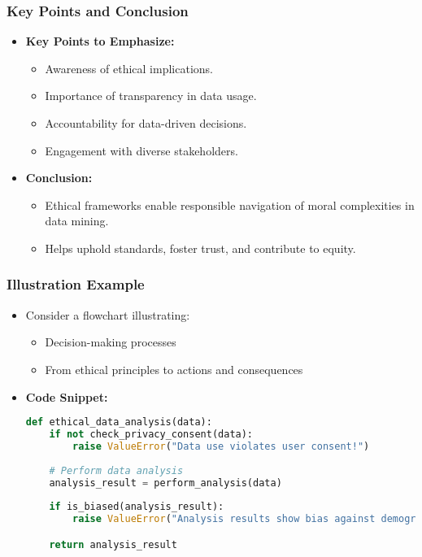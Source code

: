 \documentclass[aspectratio=169]{beamer}
\begin{document}
\begin{frame}[fragile]
    \frametitle{Key Points and Conclusion}
    \begin{itemize}
        \item \textbf{Key Points to Emphasize:}
        \begin{itemize}
            \item Awareness of ethical implications.
            \item Importance of transparency in data usage.
            \item Accountability for data-driven decisions.
            \item Engagement with diverse stakeholders.
        \end{itemize}
        \item \textbf{Conclusion:}
        \begin{itemize}
            \item Ethical frameworks enable responsible navigation of moral complexities in data mining.
            \item Helps uphold standards, foster trust, and contribute to equity.
        \end{itemize}
    \end{itemize}
\end{frame}

\begin{frame}[fragile]
    \frametitle{Illustration Example}
    \begin{itemize}
        \item Consider a flowchart illustrating:
        \begin{itemize}
            \item Decision-making processes
            \item From ethical principles to actions and consequences
        \end{itemize}
        \item \textbf{Code Snippet:}
        \begin{lstlisting}[language=python]
def ethical_data_analysis(data):
    if not check_privacy_consent(data):
        raise ValueError("Data use violates user consent!")
    
    # Perform data analysis
    analysis_result = perform_analysis(data) 
    
    if is_biased(analysis_result):
        raise ValueError("Analysis results show bias against demographic groups!")

    return analysis_result
\end{lstlisting}
    \end{itemize}
\end{frame}
\end{document}
